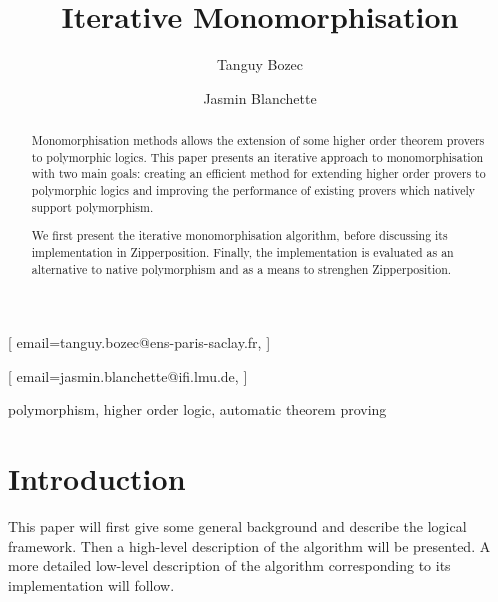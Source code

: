 \documentclass[]{ceurart}
\begin{document}


\title{Iterative Monomorphisation}

\author[1,2]{Tanguy Bozec}[%
email=tanguy.bozec@ens-paris-saclay.fr,
]
\author[2]{Jasmin Blanchette}[%
email=jasmin.blanchette@ifi.lmu.de,
]
\address[1]{Departement d'informatique, École normale supérieure Paris-Saclay, France} %
\address[2]{Institute of Informatics, Ludwig-Maximilians-Universität München, Germany}


\begin{abstract}
   Monomorphisation methods allows the extension of some higher order theorem provers to polymorphic logics. This paper presents an iterative approach to monomorphisation with two main goals: creating an efficient method for extending higher order provers to polymorphic logics and improving the performance of existing provers which natively support polymorphism.
   
   We first present the iterative monomorphisation algorithm, before discussing its implementation in Zipperposition. Finally, the implementation is evaluated as an alternative to native polymorphism and as a means to strenghen Zipperposition.
\end{abstract}

\begin{keywords}
   polymorphism\sep
   higher order logic\sep
   automatic theorem proving
\end{keywords}

\maketitle

\section{Introduction}

This paper will first give some general background and describe the logical framework. Then a high-level description of the algorithm will be presented. A more detailed low-level description of the algorithm corresponding to its implementation will follow.
\end{document}

